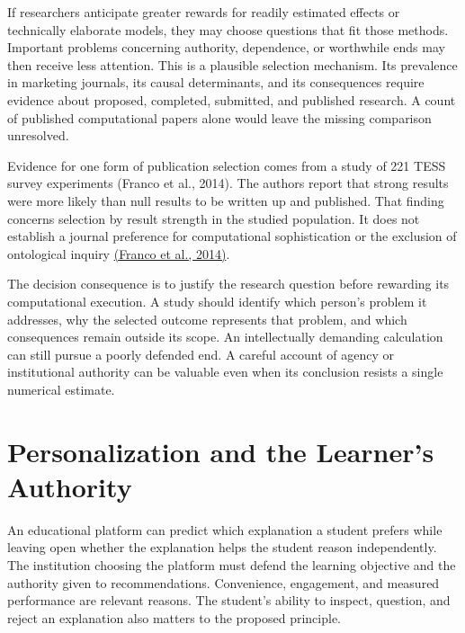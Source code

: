 \noindent \noindent If researchers anticipate greater rewards for readily
estimated effects or technically elaborate models, they may choose
questions that fit those methods. Important problems concerning
authority, dependence, or worthwhile ends may then receive less
attention. This is a plausible selection mechanism. Its prevalence in
marketing journals, its causal determinants, and its consequences
require evidence about proposed, completed, submitted, and published
research. A count of published computational papers alone would leave
the missing comparison unresolved.

Evidence for one form of publication selection comes from a study of 221
TESS survey experiments (Franco et al., 2014). The authors report that
strong results were more likely than null results to be written up and
published. That finding concerns selection by result strength in the
studied population. It does not establish a journal preference for
computational sophistication or the exclusion of ontological inquiry
\href{https://doi.org/10.1126/science.1255484}{(Franco et al., 2014)}.

The decision consequence is to justify the research question before
rewarding its computational execution. A study should identify which
person's problem it addresses, why the selected outcome represents that
problem, and which consequences remain outside its scope. An
intellectually demanding calculation can still pursue a poorly defended
end. A careful account of agency or institutional authority can be
valuable even when its conclusion resists a single numerical estimate.


\hypertarget{M09-personalization-and-the-learners-authority}{%
\section{Personalization and the Learner's
Authority}\label{M09-personalization-and-the-learners-authority}}

\noindent \noindent An educational platform can predict which explanation a
student prefers while leaving open whether the explanation helps the
student reason independently. The institution choosing the platform must
defend the learning objective and the authority given to
recommendations. Convenience, engagement, and measured performance are
relevant reasons. The student's ability to inspect, question, and reject
an explanation also matters to the proposed principle.

